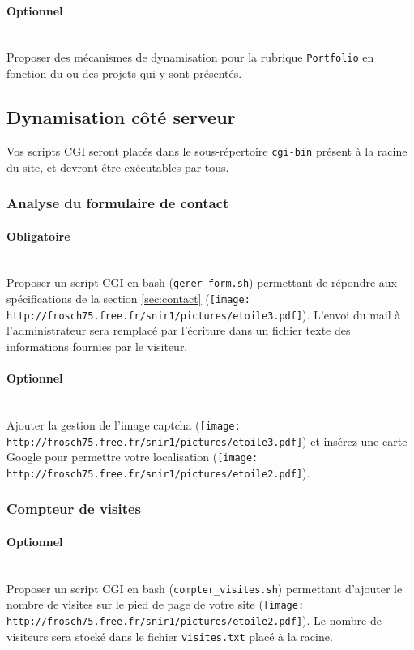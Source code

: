 \documentclass[a4paper,12pt]{article}
\newcommand\Code[1]{\textcolor{couleur_code}{\texttt{#1}}}
\begin{document}
\paragraph*{Optionnel}~\\
Proposer des mécanismes de dynamisation pour la rubrique \Code{Portfolio} 
en fonction du ou des projets qui y sont présentés.
\vspace{5pt}

\subsection{Dynamisation côté serveur}
Vos scripts CGI seront placés dans le sous-répertoire \Code{cgi-bin} présent 
à la racine du site, et devront être exécutables par tous. 

\subsubsection{Analyse du formulaire de contact}
\paragraph*{Obligatoire}~\\
Proposer un script CGI en bash (\Code{gerer\_form.sh}) permettant de répondre 
aux spécifications de la section \ref{sec:contact} 
(\texttt{[image: http://frosch75.free.fr/snir1/pictures/etoile3.pdf]}). L'envoi du mail à 
l'administrateur sera remplacé par l'écriture dans un fichier texte des 
informations fournies par le visiteur. 

\paragraph*{Optionnel}~\\
Ajouter la gestion de l'image captcha (\texttt{[image: http://frosch75.free.fr/snir1/pictures/etoile3.pdf]})
et insérez une carte Google pour permettre votre localisation   
(\texttt{[image: http://frosch75.free.fr/snir1/pictures/etoile2.pdf]}).

\subsubsection{Compteur de visites}
\paragraph*{Optionnel}~\\
Proposer un script CGI en bash (\Code{compter\_visites.sh}) permettant 
d'ajouter le nombre de visites sur le pied de page de votre site 
(\texttt{[image: http://frosch75.free.fr/snir1/pictures/etoile2.pdf]}). Le nombre de
visiteurs sera stocké dans le fichier \Code{visites.txt} placé à la racine.
\vspace{5pt}
\end{document}
